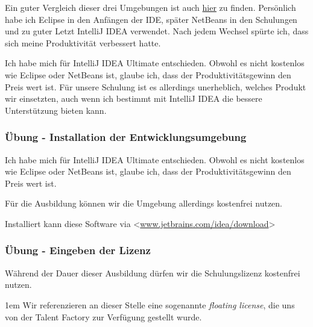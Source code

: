 Ein guter Vergleich dieser drei Umgebungen ist auch
\href{https://www.javaworld.com/article/3114167/development-tools/choosing-your-java-ide.html}
{hier} zu finden. Persönlich habe ich Eclipse in den Anfängen der IDE, später
NetBeans in den Schulungen und zu guter Letzt IntelliJ IDEA verwendet. Nach
jedem Wechsel spürte ich, dass sich meine Produktivität verbessert hatte.

Ich habe mich für IntelliJ IDEA Ultimate entschieden. Obwohl es nicht kostenlos
wie Eclipse oder NetBeans ist, glaube ich, dass der Produktivitätsgewinn den
Preis wert ist. Für unsere Schulung ist es allerdings unerheblich, welches
Produkt wir einsetzten, auch wenn ich bestimmt mit IntelliJ IDEA die bessere
Unterstützung bieten kann.


\begin{frame}[fragile]
    \frametitle<presentation>{Übung - Installation der Entwicklungsumgebung}

    Ich habe mich für IntelliJ IDEA Ultimate entschieden. Obwohl es nicht kostenlos
    wie Eclipse oder NetBeans ist, glaube ich, dass der Produktivitätsgewinn den
    Preis wert ist.

    Für die Ausbildung können wir die Umgebung allerdings kostenfrei nutzen.

    Installiert kann diese Software via <\href{https://www.jetbrains.com/idea/download}
    {www.jetbrains.com/idea/download}>

\end{frame}

\begin{frame}[fragile]
    \frametitle<presentation>{Übung - Eingeben der Lizenz}

    \begin{minipage}[b]{0.5\textwidth}
    \end{minipage}
    \begin{minipage}[b]{0.4\textwidth}
        Während der Dauer dieser Ausbildung dürfen wir die Schulungslizenz
        kostenfrei nutzen.

        \parskip1em
        Wir referenzieren an dieser Stelle eine sogenannte {\em floating license},
        die uns von der Talent Factory zur Verfügung gestellt wurde.
    \end{minipage}
    
\end{frame}


\mode*
\begin{Exercise}[%
title={Installation der Entwicklungsumgebung},
label={ex:installation-intellij}]


\end{Exercise}

